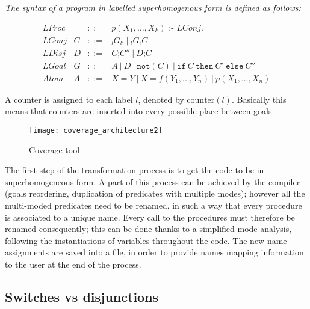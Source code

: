 \documentclass[british]{llncs}
\begin{document}
\medskip{}

\begin{definition}
\noindent \textit{The syntax of a program in labelled superhomogenous
form is defined as follows:}

{\small \[
\begin{array}{llcl}
LProc &  & ::= & p(X_{1},\ldots,X_{k})\texttt{ :- }LConj.\\
LConj & C & ::= & _{l}G_{l'}\ |\ _{l}G\texttt{,}C\\
LDisj & D & ::= & C\texttt{;}C''\ |\ D\texttt{;}C\\
LGoal & G & ::= & A\ |\ D\ |\ \texttt{not}(C)\ |\ \texttt{if}\ C\ \texttt{then}\ C'\ \texttt{else}\ C''\\
Atom & A & ::= & X=Y\ |\ X=f(Y_{1},...,Y_{n})\ |\ p(X_{1},...,X_{n})\end{array}\]
 }{\small \par}
\end{definition}

A counter is assigned to each label $l$, denoted by $\textrm{counter}(l)$.
Basically this means that counters are inserted into every possible
place between goals.

\begin{figure}[h]
\begin{centering}
\texttt{[image: coverage\_architecture2]}
\par\end{centering}

\caption{\label{fig:Coverage-tool}Coverage tool}

\end{figure}




The first step of the transformation process is to get
the code to be in superhomogeneous form. A part of this process can be achieved by the compiler (goals reordering, duplication of predicates with multiple modes); however all the multi-moded predicates need to be renamed, in such a way that every procedure is associated to
a unique name. Every call to the procedures must therefore be renamed consequently; this
can be done thanks to a simplified mode analysis, following the instantiations
of variables throughout the code. The new name assignments are saved
into a file, in order to provide names mapping information to the user at the end of the process.


\subsection{Switches vs disjunctions}
\end{document}
